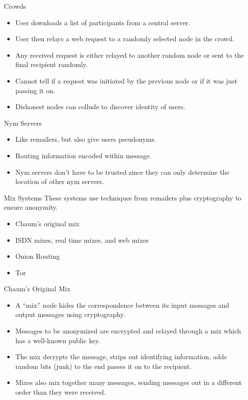 \documentclass[default,pdf,colorBG,slideColor]{prosper}
\begin{document}
\begin{slide}{Crowds}
\begin{itemize}
\item User downloads a list of participants from a central server.
\item User then relays a web request to a randomly selected node in the crowd.
\item Any received request is either relayed to another random node or sent to the final recipient randomly.
\item Cannot tell if a request was initiated by the previous node or if it was just passing it on.
\item Dishonest nodes can collude to discover identity of users.
\end{itemize}
\end{slide}

\begin{slide}{Nym Servers}
\begin{itemize}
\item Like remailers, but also give users pseudonyms.
\item Routing information encoded within message.
\item Nym servers don't have to be trusted since they can only determine the location of other nym servers.
\end{itemize}
\end{slide}

\begin{slide}{Mix Systems}
These systems use techniques from remailers plus cryptography to ensure anonymity.
\begin{itemize}
\item Chaum's original mix
\item ISDN mixes, real time mixes, and web mixes
\item Onion Routing
\item Tor
\end{itemize}
\end{slide}

\begin{slide}{Chaum's Original Mix}
\begin{itemize}
\item A ``mix'' node hides the correspondence between its input messages and output messages using cryptography.
\item Messages to be anonymized are encrypted and relayed through a mix which has a well-known public key.
\item The mix decrypts the message, strips out identifying information, adds random bits (junk) to the end passes it on to the recipient.
\item Mixes also mix together many messages, sending messages out in a different order than they were received.
\end{itemize}
\end{slide}
\end{document}
